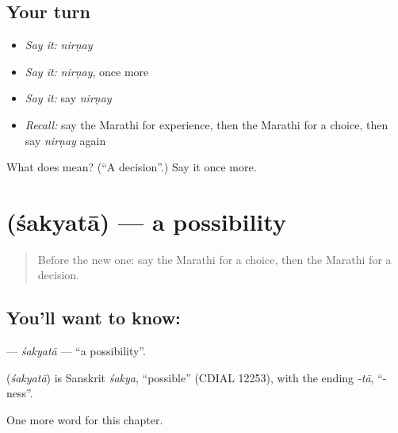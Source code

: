 \subsection*{Your turn}
\begin{itemize}
\raggedright
  \item \emph{Say it:} \emph{nirṇay}
  \item \emph{Say it:} \emph{nirṇay}, once more
  \item \emph{Say it:} say \emph{nirṇay}
  \item \emph{Recall:} say the Marathi for experience, then the Marathi for a choice, then say \emph{nirṇay} again
\end{itemize}

\begin{tcolorbox}[breakable,colback=teal!4,colframe=teal!35!black,title={Before you move on}]
What does  mean? (\textquotedblleft{}A decision\textquotedblright{}.) Say it once more.
\end{tcolorbox}
\section[\texorpdfstring{\mr{शक्यता} (śakyatā)}{शक्यता (śakyatā)}]{ (śakyatā) — a possibility}

\label{lesson:MR-C211-sakyata}



\begin{quote}
Before the new one: say the Marathi for a choice, then the Marathi for a decision.
\end{quote}

\subsection*{You'll want to know: }
\textbf{} — \emph{śakyatā} — \textquotedblleft{}a possibility\textquotedblright{}.

\begin{cousinweb}
\textbf{} (\emph{śakyatā}) is Sanskrit \emph{śakya}, \textquotedblleft{}possible\textquotedblright{} (CDIAL 12253), with the ending \emph{-tā}, \textquotedblleft{}-ness\textquotedblright{}.
\end{cousinweb}

\begin{grammarlens}[title={What you've built}]
One more word for this chapter.
\end{grammarlens}

